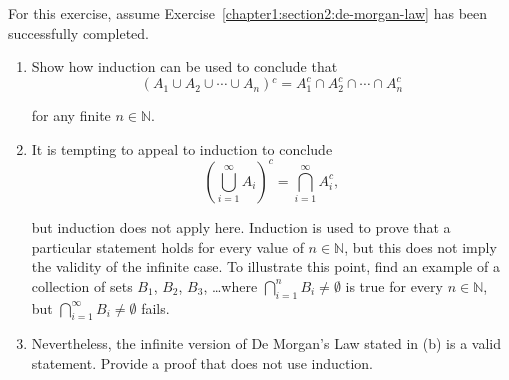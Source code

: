 \documentclass[class=understanding-analysis,crop=false]{standalone}
\begin{document}
\begin{exercise}
    \par For this exercise, assume Exercise~\ref{chapter1:section2:de-morgan-law} has been successfully completed.
    \begin{enumerate}[label = (\alph*)]
        \item Show how induction can be used to conclude that
              \[
                  (A_{1} \cup A_{2} \cup \cdots \cup A_{n}){}^{c} = A_{1}^{c} \cap A_{2}^{c} \cap \cdots \cap A_{n}^{c}
              \]
              \par for any finite $n \in \mathbb{N}$.
        \item It is tempting to appeal to induction to conclude
              \[
                  {\left(\bigcup^{\infty}_{i=1}A_{i}\right)}^{c} = \bigcap^{\infty}_{i=1}A_{i}^{c},
              \]
              \par but induction does not apply here. Induction is used to prove that a particular statement holds for every value of $n \in \mathbb{N}$, but this does not imply the validity of the infinite case. To illustrate this point, find an example of a collection of sets $B_{1}$, $B_{2}$, $B_{3}$, \ldots where $\bigcap^{n}_{i=1}B_{i} \ne \emptyset$ is true for every $n \in \mathbb{N}$, but $\bigcap^{\infty}_{i=1}B_{i} \ne \emptyset$ fails.
        \item Nevertheless, the infinite version of De Morgan's Law stated in (b) is a valid statement. Provide a proof that does not use induction.
    \end{enumerate}
\end{exercise}
\end{document}
